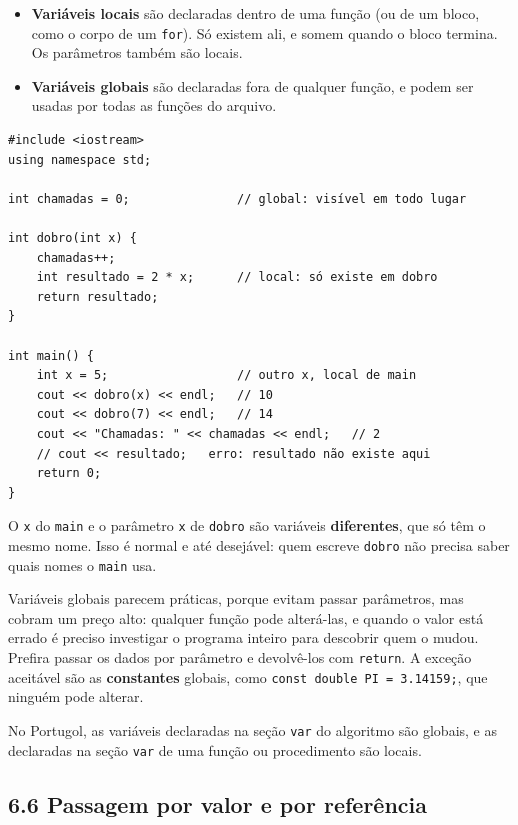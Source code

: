 \begin{itemize}
  \item \textbf{Variáveis locais} são declaradas dentro de uma função (ou de um bloco, como o corpo de um \texttt{for}). Só existem ali, e somem quando o bloco termina. Os parâmetros também são locais.
  \item \textbf{Variáveis globais} são declaradas fora de qualquer função, e podem ser usadas por todas as funções do arquivo.
\end{itemize}

\begin{codigo}
\begin{Verbatim}[breaklines=true, breaksymbolleft={}, fontsize=\footnotesize]
#include <iostream>
using namespace std;

int chamadas = 0;               // global: visível em todo lugar

int dobro(int x) {
    chamadas++;
    int resultado = 2 * x;      // local: só existe em dobro
    return resultado;
}

int main() {
    int x = 5;                  // outro x, local de main
    cout << dobro(x) << endl;   // 10
    cout << dobro(7) << endl;   // 14
    cout << "Chamadas: " << chamadas << endl;   // 2
    // cout << resultado;   erro: resultado não existe aqui
    return 0;
}
\end{Verbatim}
\end{codigo}

O \texttt{x} do \texttt{main} e o parâmetro \texttt{x} de \texttt{dobro} são variáveis \textbf{diferentes}, que só têm o mesmo nome. Isso é normal e até desejável: quem escreve \texttt{dobro} não precisa saber quais nomes o \texttt{main} usa.

Variáveis globais parecem práticas, porque evitam passar parâmetros, mas cobram um preço alto: qualquer função pode alterá-las, e quando o valor está errado é preciso investigar o programa inteiro para descobrir quem o mudou. Prefira passar os dados por parâmetro e devolvê-los com \texttt{return}. A exceção aceitável são as \textbf{constantes} globais, como \texttt{const double PI = 3.14159;}, que ninguém pode alterar.

No Portugol, as variáveis declaradas na seção \texttt{var} do algoritmo são globais, e as declaradas na seção \texttt{var} de uma função ou procedimento são locais.

\subsection{6.6 Passagem por valor e por referência}

